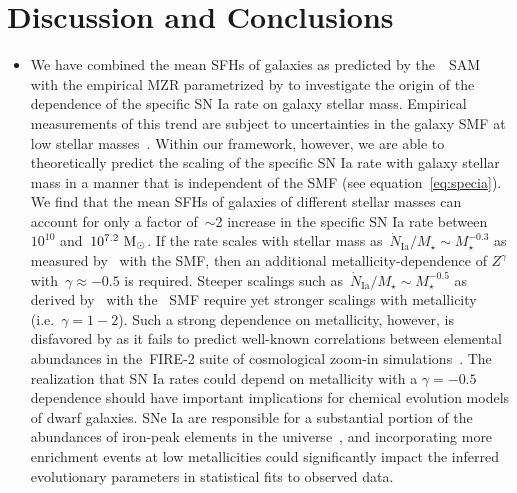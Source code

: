 \documentclass[ms.tex]{subfiles}
\begin{document}
\section{Discussion and Conclusions}
\label{sec:conclusions}

\begin{itemize}


	\item We have combined the mean SFHs of galaxies as predicted by
	the~\um~SAM~\citep{Behroozi2019} with the empirical MZR parametrized by
	\citet{Zahid2014} to investigate the origin of the dependence of the
	specific SN Ia rate on galaxy stellar mass.
	Empirical measurements of this trend are subject to uncertainties in the
	galaxy SMF at low stellar masses~\citep{Gandhi2022}.
	Within our framework, however, we are able to theoretically predict the
	scaling of the specific SN Ia rate with galaxy stellar mass in a manner
	that is independent of the SMF (see equation~\ref{eq:specia}).
	We find that the mean SFHs of galaxies of different stellar masses can
	account for only a factor of~$\sim$2 increase in the specific SN Ia rate
	between~$10^{10}$ and~$10^{7.2}~\text{M}_\odot$.
	If the rate scales with stellar mass as~$\dot{N}_\text{Ia} / M_\star
	\sim M_\star^{-0.3}$ as measured by~\citet{Gandhi2022} with the
	\citet{Baldry2012} SMF, then an additional metallicity-dependence of
	$Z^\gamma$ with~$\gamma \approx -0.5$ is required.
	Steeper scalings such as~$\dot{N}_\text{Ia} / M_\star \sim M_\star^{-0.5}$
	as derived by~\citet{Brown2019} with the~\citet{Bell2003} SMF require yet
	stronger scalings with metallicity (i.e.~$\gamma = 1 - 2$).
	Such a strong dependence on metallicity, however, is disfavored by
	\citet{Gandhi2022} as it fails to predict well-known correlations between
	elemental abundances in the~\textsc{FIRE-2} suite of cosmological zoom-in
	simulations~\citep{Hopkins2018}.
	The realization that SN Ia rates could depend on metallicity with a
	$\gamma = -0.5$ dependence should have important implications for chemical
	evolution models of dwarf galaxies.
	SNe Ia are responsible for a substantial portion of the abundances of
	iron-peak elements in the universe~\citep[e.g.][]{Johnson2019}, and
	incorporating more enrichment events at low metallicities could
	significantly impact the inferred evolutionary parameters in statistical
	fits to observed data.


\end{itemize}
\end{document}
